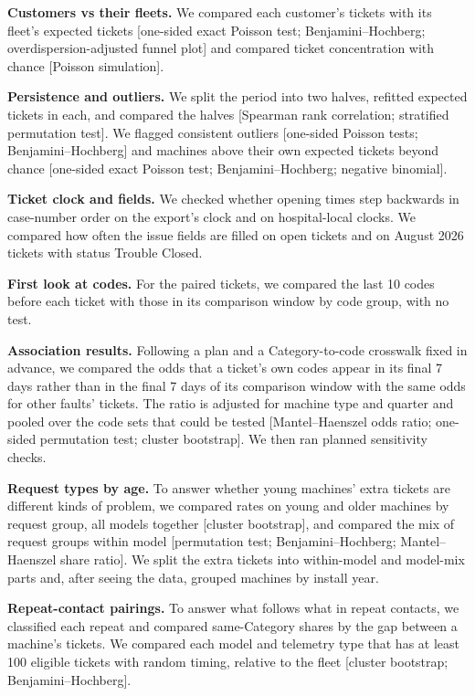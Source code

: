 \smallskip\noindent\textbf{Customers vs their fleets.}
We compared each customer's tickets with its fleet's expected tickets [one-sided exact Poisson test; Benjamini--Hochberg; overdispersion-adjusted funnel plot] and compared ticket concentration with chance [Poisson simulation].

\smallskip\noindent\textbf{Persistence and outliers.}
We split the period into two halves, refitted expected tickets in each, and compared the halves [Spearman rank correlation; stratified permutation test]. We flagged consistent outliers [one-sided Poisson tests; Benjamini--Hochberg] and machines above their own expected tickets beyond chance [one-sided exact Poisson test; Benjamini--Hochberg; negative binomial].

\smallskip\noindent\textbf{Ticket clock and fields.}
We checked whether opening times step backwards in case-number order on the export's clock and on hospital-local clocks. We compared how often the issue fields are filled on open tickets and on August 2026 tickets with status Trouble Closed.

\smallskip\noindent\textbf{First look at codes.}
For the paired tickets, we compared the last 10 codes before each ticket with those in its comparison window by code group, with no test.

\smallskip\noindent\textbf{Association results.}
Following a plan and a Category-to-code crosswalk fixed in advance, we compared the odds that a ticket's own codes appear in its final 7 days rather than in the final 7 days of its comparison window with the same odds for other faults' tickets. The ratio is adjusted for machine type and quarter and pooled over the code sets that could be tested [Mantel--Haenszel odds ratio; one-sided permutation test; cluster bootstrap]. We then ran planned sensitivity checks.

\smallskip\noindent\textbf{Request types by age.}
To answer whether young machines' extra tickets are different kinds of problem, we compared rates on young and older machines by request group, all models together [cluster bootstrap], and compared the mix of request groups within model [permutation test; Benjamini--Hochberg; Mantel--Haenszel share ratio]. We split the extra tickets into within-model and model-mix parts and, after seeing the data, grouped machines by install year.

\smallskip\noindent\textbf{Repeat-contact pairings.}
To answer what follows what in repeat contacts, we classified each repeat and compared same-Category shares by the gap between a machine's tickets. We compared each model and telemetry type that has at least 100 eligible tickets with random timing, relative to the fleet [cluster bootstrap; Benjamini--Hochberg].


